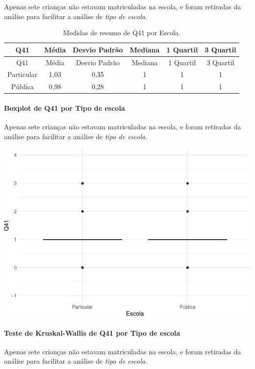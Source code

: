 \documentclass[]{article}
\let\oldparagraph\paragraph
\renewcommand{\paragraph}[1]{\oldparagraph{#1}\mbox{}}
\begin{document}
Apenas sete crianças não estavam matriculadas na escola, e foram retiradas da análise para facilitar a análise de \emph{tipo de escola}.

\begin{longtable}[]{@{}cccccc@{}}
\caption{\label{tab:unnamed-chunk-1650}Medidas de resumo de Q41 por Escola.}\tabularnewline
\toprule
Q41 & Média & Desvio Padrão & Mediana & 1 Quartil & 3 Quartil\tabularnewline
\midrule
\endfirsthead
\toprule
Q41 & Média & Desvio Padrão & Mediana & 1 Quartil & 3 Quartil\tabularnewline
\midrule
\endhead
Particular & 1,03 & 0,35 & 1 & 1 & 1\tabularnewline
Pública & 0,98 & 0,28 & 1 & 1 & 1\tabularnewline
\bottomrule
\end{longtable}

\hypertarget{boxplot-de-q41-por-tipo-de-escola}{%
\paragraph{Boxplot de Q41 por Tipo de escola}\label{boxplot-de-q41-por-tipo-de-escola}}

Apenas sete crianças não estavam matriculadas na escola, e foram retiradas da análise para facilitar a análise de \emph{tipo de escola}.

\begin{center}\includegraphics[width=0.75\linewidth]{relatorio_covid19_files/figure-latex/unnamed-chunk-1651-1} \end{center}

\hypertarget{teste-de-kruskal-wallis-de-q41-por-tipo-de-escola}{%
\paragraph{Teste de Kruskal-Wallis de Q41 por Tipo de escola}\label{teste-de-kruskal-wallis-de-q41-por-tipo-de-escola}}

Apenas sete crianças não estavam matriculadas na escola, e foram retiradas da análise para facilitar a análise de \emph{tipo de escola}.
\end{document}
